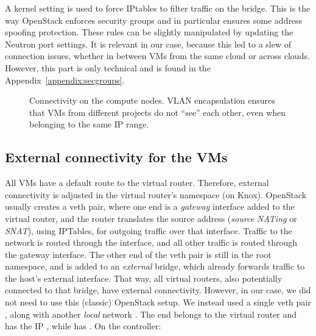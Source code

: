 
A kernel setting is used to force IPtables to filter traffic on the
bridge. This is the way OpenStack enforces security groups and in
particular ensures some address spoofing protection. These rules can
be slightly manipulated by updating the Neutron port settings.
%
It is relevant in our case, because this led to a slew of connection
issues, whether in between VMs from the same cloud or across
clouds. However, this part is only technical and is found in the
Appendix~\ref{appendix:secgroups}.

\begin{figure}[ht]%
  \centering
  
  \caption{Connectivity on the compute nodes. VLAN encapsulation
    ensures that VMs from different projects do not ``see'' each
    other, even when belonging to the same IP range.}
  \label{figure:connectivity:compute:nodes}
\end{figure}


\subsection{External connectivity for the VMs}
\label{section:implementation:external:connectivity}

All VMs have a default route to the virtual router. Therefore,
external connectivity is adjusted in the virtual router's namespace
(on Knox).
%
OpenStack usually creates a veth pair, where one end is a
\emph{gateway} interface added to the virtual router, and the router
translates the source address (\emph{source NATing} or \emph{SNAT}),
using IPTables, for outgoing traffic over that interface. Traffic to
the  network is routed through the
 interface, and all other traffic is routed through
the gateway interface.
%
The other end of the veth pair is still in the root namespace, and is
added to an \emph{external} bridge, which already forwards traffic to
the host's external interface. That way, all virtual routers, also
potentially connected to that bridge, have external connectivity.
%
However, in our case, we did not need to use this (classic) OpenStack
setup. We instead used a single veth pair%
, along with another \emph{local} network
. The  end belongs to the virtual router
and has the IP , while  has .
%
On the controller:

